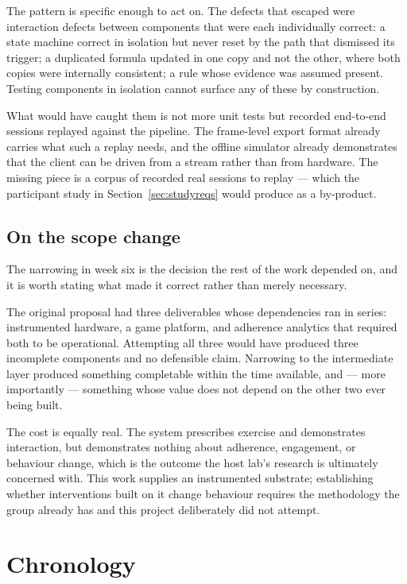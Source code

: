 \documentclass[11pt,a4paper]{article}
\begin{document}
The pattern is specific enough to act on. The defects that escaped were
interaction defects between components that were each individually correct: a
state machine correct in isolation but never reset by the path that dismissed
its trigger; a duplicated formula updated in one copy and not the other, where
both copies were internally consistent; a rule whose evidence was assumed
present. Testing components in isolation cannot surface any of these by
construction.

What would have caught them is not more unit tests but recorded end-to-end
sessions replayed against the pipeline. The frame-level export format already
carries what such a replay needs, and the offline simulator already demonstrates
that the client can be driven from a stream rather than from hardware. The
missing piece is a corpus of recorded real sessions to replay --- which the
participant study in Section~\ref{sec:studyreqs} would produce as a by-product.

\subsection{On the scope change}

The narrowing in week six is the decision the rest of the work depended on, and
it is worth stating what made it correct rather than merely necessary.

The original proposal had three deliverables whose dependencies ran in series:
instrumented hardware, a game platform, and adherence analytics that required
both to be operational. Attempting all three would have produced three
incomplete components and no defensible claim. Narrowing to the intermediate
layer produced something completable within the time available, and --- more
importantly --- something whose value does not depend on the other two ever
being built.

The cost is equally real. The system prescribes exercise and demonstrates
interaction, but demonstrates nothing about adherence, engagement, or behaviour
change, which is the outcome the host lab's research is ultimately concerned
with. This work supplies an instrumented substrate; establishing whether
interventions built on it change behaviour requires the methodology the group
already has and this project deliberately did not attempt.

\section{Chronology}
\label{sec:chronology}
\end{document}
